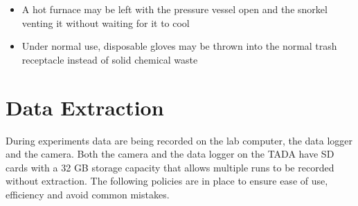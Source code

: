 \documentclass[letterpaper,11pt]{article}
\begin{document}
\begin{itemize}
    \item A hot furnace may be left with the pressure vessel open and the snorkel 
        venting it without waiting for it to cool
    \item Under normal use, disposable gloves may be thrown into the normal 
        trash receptacle instead of solid chemical waste
    \end{itemize}

\newpage    

\section{Data Extraction} \label{sec:data}
During experiments data are being recorded on the lab computer, the data logger 
and the camera. Both the camera and the data logger on the TADA have SD cards 
with a 32 GB storage capacity that allows multiple runs to be recorded without 
extraction. The following policies are in place to ensure ease of use, 
efficiency and avoid common mistakes.
\end{document}
